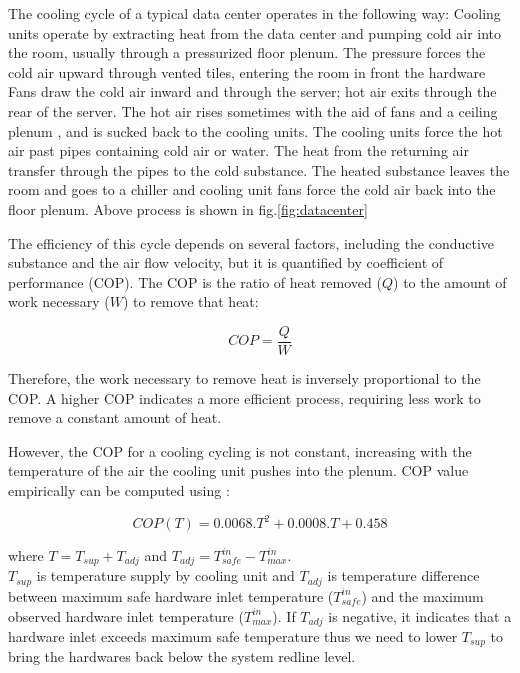 \documentclass[JIP]{ipsj}
\begin{document}
The cooling cycle of a typical data center operates in the following way:
Cooling units operate by extracting heat from the data center and pumping cold air into the room, usually through a pressurized floor plenum.
The pressure forces the cold air upward through vented tiles, entering the room in front the hardware
Fans draw the cold air inward and through the server; hot air exits through the rear of the server.
The hot air rises sometimes with the aid of fans and a ceiling plenum , and is sucked back to the cooling units.
The cooling units force the hot air past pipes containing cold air or water. 
The heat from the returning air transfer through the pipes to the cold substance. 
The heated substance leaves the room and goes to a chiller and cooling unit fans force the cold air back into the floor plenum. 
Above process is shown in fig.\ref{fig:datacenter}

The efficiency of this cycle depends on several factors, including the conductive substance and the air flow velocity, but it is quantified by coefficient of performance (COP).
The COP is the ratio of heat removed ($Q$) to the amount of work necessary ($W$) to remove that heat:

\begin{equation}\label{eqn:cop}
	COP=\frac{Q}{W}
\end{equation}

Therefore, the work necessary to remove heat is inversely proportional to the COP.  
A higher COP indicates a more efficient process, requiring less work to remove a constant amount of heat.

However, the COP for a cooling cycling is not constant, increasing with the temperature of the air the cooling unit pushes into the plenum.  
COP value empirically can be computed using \cite{moore2005making}:

\begin{equation}\label{eqn:copt}
	COP(T) = 0.0068.T^2 + 0.0008.T + 0.458
\end{equation}

where $T = T_{sup} + T_{adj}$ and $T_{adj} = T_{safe}^{in}-T_{max}^{in}$. \\
$T_{sup}$ is temperature supply by cooling unit and $T_{adj}$ is temperature difference between maximum safe hardware inlet temperature ($T_{safe}^{in}$) and the maximum observed hardware inlet temperature ($T_{max}^{in}$).
If $T_{adj}$ is negative, it indicates that a hardware inlet exceeds maximum safe temperature thus we need to lower $T_{sup}$ to bring the hardwares back below the system redline level.
\end{document}
